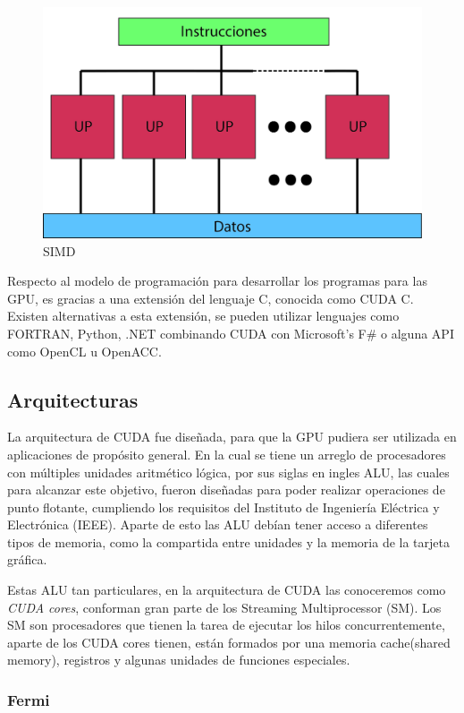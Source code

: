 \begin{figure}[h]
			\centering
				\includegraphics[scale=0.1]{img/SIMD.jpg}
			\caption{SIMD}
\end{figure}


Respecto al modelo de programación para desarrollar los programas para las GPU, es gracias a una extensión del lenguaje C, conocida como CUDA C. Existen alternativas a esta extensión, se pueden utilizar lenguajes como FORTRAN, Python, .NET combinando CUDA con Microsoft's F\# o alguna API como OpenCL u OpenACC\cite{lenguajes}. 
 

\subsection{Arquitecturas}
La arquitectura de CUDA fue diseñada, para que la GPU pudiera ser utilizada en aplicaciones de propósito general. En la cual se tiene un arreglo de procesadores con múltiples unidades aritmético lógica, por sus siglas en ingles ALU, las cuales para alcanzar este objetivo, fueron diseñadas para poder realizar operaciones de punto flotante, cumpliendo los requisitos del Instituto de Ingeniería Eléctrica y Electrónica (IEEE). Aparte de esto las ALU debían tener acceso a diferentes tipos de memoria, como la compartida entre unidades y la memoria de la tarjeta gráfica. 

Estas ALU tan particulares, en la arquitectura de CUDA las conoceremos como \textit{CUDA cores}, conforman gran parte de los Streaming Multiprocessor (SM). Los SM son procesadores que tienen la tarea de ejecutar los hilos concurrentemente, aparte de los CUDA cores tienen, están formados por una memoria cache(shared memory), registros y algunas unidades de funciones especiales.

\subsubsection{Fermi}

